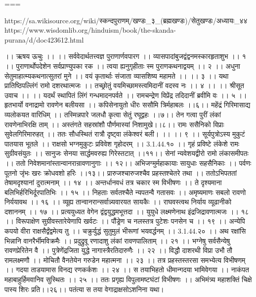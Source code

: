 ===

https://sa.wikisource.org/wiki/स्कन्दपुराणम्/खण्डः_३_(ब्रह्मखण्डः)/सेतुखण्डः/अध्यायः_४४
https://www.wisdomlib.org/hinduism/book/the-skanda-purana/d/doc423612.html

।। ऋषय ऊचुः ।। ।।
सर्ववेदार्थतत्त्वज्ञ पुराणार्णवपारग ।।
व्यासपादांबुजद्वंद्वनमस्कारहृताशुभ ।। १ ।।
पुराणार्थोपदेशेन सर्वप्राण्युपका रक ।।
त्वया ह्यनुगृहीताः स्म पुराणकथनाद्वयम् ।। २ ।।
अधुना सेतुमाहात्म्यकथनात्सुतरां मुने ।।
वयं कृतार्थाः संजाता व्यासशिष्य महामते ।। ।। ३ ।।
यथा प्रातिष्ठिपल्लिंगं रामो दशरथात्मजः ।।
तच्छ्रोतुं वयमिच्छामस्त्वमिदानीं वदस्व नः ।। ४ ।।
।। श्रीसूत उवाच ।। ।।
यदर्थं स्थापितं लिंगं गन्धमादनपर्वते ।।
रामचन्द्रेण विप्रेंद्र तदिदानीं ब्रवीमि वः ।। ५ ।।
हृतभार्यो वनाद्रामो रावणेन बलीयसा ।।
कपिसेनायुतो धीरः ससौमि त्रिर्महाबलः ।।६।।
महेंद्रं गिरिमासाद्य व्यलोकयत वारिधिम् ।।
तस्मिन्नपारे जलधौ कृत्वा सेतुं रघूद्वहः ।।७।।
तेन गत्वा पुरीं लंकां रावणेनाभिरक्षि ताम् ।।
अस्तंगते सहस्रांशौ पौर्णमास्यां निशामुखे।।८।।
रामः ससैनिको विप्राः सुवेलगिरिमारुहत् ।।
ततः सौधस्थितं रात्रौ दृष्ट्वा लंकेश्वरं बली। ।। ।। ९ ।।
सूर्यपुत्रोऽस्य मुकुटं पातयास भूतले ।।
राक्षसो भग्नमुकुटः प्रविवेश गृहोदरम् ।। 3.1.44.१० ।।
गृहं प्रविष्टे लंकेशे रामः सुग्रीवसंयुतः ।।
सानुजः सेनया सार्द्धमवरुह्य गिरेस्तटात् ।।११।।
सेनां न्यवेशयद्वीरो रामो लंकासमीपतः ।।
ततो निवेशमानांस्तान्वानरान्रावणानुगाः ।। १२।।
अभिजग्मुर्महाकायाः सायुधाः सहसैनिकाः ।।
पर्वणः पूतनो जृंभः खरः क्रोधवशो हरिः ।।१३।।
प्रारुजश्चारुजश्चैव प्रहस्तश्चेतरे तथा ।।
ततोऽभिपततां तेषामदृश्यानां दुरात्मनाम् ।। १४ ।।
अन्तर्धानवधं तत्र चकार स्म विभीषणः ।।
ते दृश्यमाना बलिभिर्हरिभिर्दूरपातिभिः ।। १५ ।।
निहताः सर्वतश्चैते न्यपतन्वै गतासवः ।।
अमृष्यमाणः सबलो रावणो निर्ययावथ ।। १६ ।।
व्यूह्य तान्वानरान्सर्वान्न्यवारयत सायकैः ।।
राघवस्त्वथ निर्याय व्यूढानीको दशाननम् ।। १७ ।।
प्रत्ययुध्यत वेगेन द्वंद्वयुद्धमभूत्तदा ।।
युयुधे लक्ष्मणेनाथ इंद्रजिद्रावणात्मजः ।। १८ ।।
विरूपाक्षेण सुग्रीवस्तारेयेणापि खर्वटः ।।
पौंड्रेण च नलस्तत्र पुटेशः पनसेन च ।। १९ ।।
अन्येपि कपयो वीरा राक्षसैर्द्वंद्वमेत्य तु ।।
चक्रुर्युद्धं सुतुमुलं भीरूणां भयवर्द्धनम् ।। 3.1.44.२० ।।
अथ रक्षांसि भिन्नानि वानरैर्भीमविक्रमैः ।।
प्रदुद्रुवू रणादाशु लंकां रावणपालिताम् ।। २१ ।।
भग्नेषु सर्वसैन्येषु रावणप्रेरितेन वै ।।
पुत्रेणेंद्रजिता युद्धे नागास्त्रैरतिदारुणैः ।। २२ ।।
विद्धौ दाशरथी विप्रा उभौ तौ रामलक्ष्मणौ ।।
मोचितौ वैनतेयेन गरुडेन महात्मना ।। २३ ।।
तत्र प्रहस्तस्तरसा समभ्येत्य विभीषणम् ।।
गदया ताडयामास विनद्य रणकर्कशः ।। २४ ।।
स तयाभिहतो धीमान्गदया भामिवेगया ।।
नाकंपत महाबाहुर्हिमवानिव सुस्थितः ।। २५ ।।
ततः प्रगृह्य विपुलामष्टघंटां विभीषणः ।।
अभिमंत्र्य महाशक्तिं चिक्षे पास्य शिरः प्रति।।२६।।
पतंत्या स तया वेगाद्राक्षसोऽशनिना यथा।
